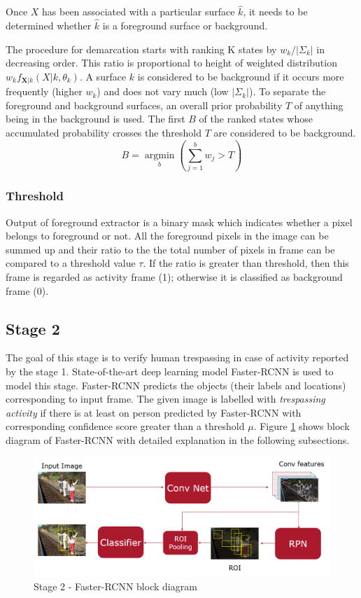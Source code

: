 Once $X$ has been associated with a particular surface $\hat{k}$, it needs to be determined whether $\hat{k}$ is a foreground surface or background. 

The procedure for demarcation starts with ranking K states by $w_k / | \Sigma_k |$ in decreasing order. This ratio is proportional to height of weighted distribution $w_k f_{\mathbf{X}|k}(X|k,\theta_k)$. A surface $k$ is considered to be 
background if it occurs more frequently (higher $w_k$) and does not vary much (low $|\Sigma_k|$).  To separate the foreground and background surfaces, an overall prior probability $T$ of anything being in the background is used. The first $B$ of the ranked  states whose accumulated probability crosses the threshold $T$ are considered to be background. 
$$ B=\operatorname*{argmin}_b (\sum_{j=1}^b w_{j} > T)$$ 



\subsubsection{Threshold}
Output of foreground extractor is a binary mask which indicates whether a pixel belongs to foreground or not. All the foreground pixels in the image can be summed up and their ratio to the the total number of pixels in frame can be compared to a threshold value $\tau$. If the ratio is greater than threshold, then this frame is regarded as activity frame (1); otherwise it is classified as background frame (0). 


\subsection{Stage 2}
The goal of this stage is to verify human trespassing in case of activity reported by the stage 1. State-of-the-art deep learning model Faster-RCNN\cite{ref_fasterrcnn} is used to model this stage. Faster-RCNN predicts the objects (their labels and locations) corresponding to input frame. The given image is labelled with \textit{trespassing activity} if there is at least on person predicted by Faster-RCNN with corresponding confidence score greater than a threshold $\mu$. Figure \ref{fig:faster-rcnn-pipeline} shows block diagram of Faster-RCNN with detailed explanation in the following subsections. 


\begin{figure}
    \centering
    \includegraphics[width=\linewidth]{images/faster-rcnn-pipeline.PNG}
    \caption{Stage 2 - Faster-RCNN block diagram}
    \label{fig:faster-rcnn-pipeline}
\end{figure}

